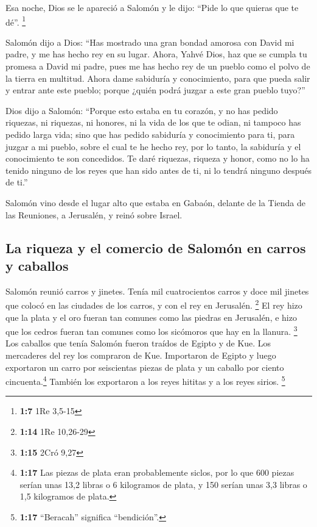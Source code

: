 \begin{paracol}{2}
 Esa noche, Dios se le apareció a Salomón y le dijo:
``Pide lo que quieras que te dé''. \footnote{\textbf{1:7} 1Re 3,5-15}

 Salomón dijo a Dios: ``Has mostrado una gran bondad
amorosa con David mi padre, y me has hecho rey en su lugar.
 Ahora, Yahvé Dios, haz que se cumpla tu promesa a David
mi padre, pues me has hecho rey de un pueblo como el polvo de la tierra
en multitud.  Ahora dame sabiduría y conocimiento, para
que pueda salir y entrar ante este pueblo; porque ¿quién podrá juzgar a
este gran pueblo tuyo?''

 Dios dijo a Salomón: ``Porque esto estaba en tu corazón,
y no has pedido riquezas, ni riquezas, ni honores, ni la vida de los que
te odian, ni tampoco has pedido larga vida; sino que has pedido
sabiduría y conocimiento para ti, para juzgar a mi pueblo, sobre el cual
te he hecho rey,  por lo tanto, la sabiduría y el
conocimiento te son concedidos. Te daré riquezas, riqueza y honor, como
no lo ha tenido ninguno de los reyes que han sido antes de ti, ni lo
tendrá ninguno después de ti.''

 Salomón vino desde el lugar alto que estaba en Gabaón,
delante de la Tienda de las Reuniones, a Jerusalén, y reinó sobre
Israel.

\hypertarget{la-riqueza-y-el-comercio-de-salomuxf3n-en-carros-y-caballos}{%
\subsection{La riqueza y el comercio de Salomón en carros y
caballos}\label{la-riqueza-y-el-comercio-de-salomuxf3n-en-carros-y-caballos}}

 Salomón reunió carros y jinetes. Tenía mil cuatrocientos
carros y doce mil jinetes que colocó en las ciudades de los carros, y
con el rey en Jerusalén. \footnote{\textbf{1:14} 1Re 10,26-29}
 El rey hizo que la plata y el oro fueran tan comunes
como las piedras en Jerusalén, e hizo que los cedros fueran tan comunes
como los sicómoros que hay en la llanura. \footnote{\textbf{1:15} 2Cró
  9,27}  Los caballos que tenía Salomón fueron traídos de
Egipto y de Kue. Los mercaderes del rey los compraron de Kue.
 Importaron de Egipto y luego exportaron un carro por
seiscientas piezas de plata y un caballo por ciento
cincuenta.\footnote{\textbf{1:17} Las piezas de plata eran probablemente
  siclos, por lo que 600 piezas serían unas 13,2 libras o 6 kilogramos
  de plata, y 150 serían unas 3,3 libras o 1,5 kilogramos de plata.}
También los exportaron a los reyes hititas y a los reyes sirios.
\footnote{\textbf{1:17} ``Beracah'' significa ``bendición''.}


\end{paracol}
